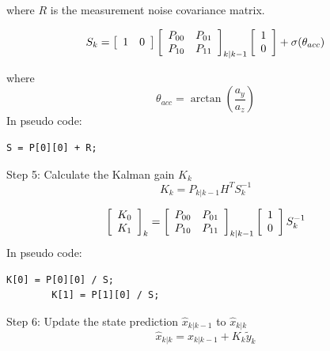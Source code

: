\documentclass[a4paper]{report}
\begin{document}
		where $R$ is the measurement noise covariance matrix.

		\begin{equation}
		S_{k}=
		\left[
		\begin{array}{c c}
		1	&	0
		\end{array} \right]
		\left[
		\begin{array}{c c}
		P_{00}	&	P_{01}\\
		P_{10}	&	P_{11}
		\end{array} \right]_{k|k-1}
		\left[
		\begin{array}{c}
		1\\
		0
		\end{array} \right]
		+ \sigma(\theta_{acc})
		\end{equation}

		where
		\begin{equation*}
		\theta_{acc}=\arctan{\left(\frac{a_{y}}{a_{z}}\right)}
		 \end{equation*}
    In pseudo code:
		\begin{lstlisting}[frame=single]
		S = P[0][0] + R;
		\end{lstlisting}
		Step 5: Calculate the Kalman gain $K_{k}$
		\begin{equation}
		K_{k}=P_{k|k-1}H^{T}S^{-1}_{k}
		\end{equation}

		\begin{equation}
		\left[
		\begin{array}{c}
		K_{0}\\
		K_{1}
		\end{array} \right]_{k}
		=
		\left[
		\begin{array}{c c}
		P_{00}	&	P_{01}\\
		P_{10}	&	P_{11}
		\end{array}  \right]_{k|k-1}
		\left[
		\begin{array}{c}
		1\\
		0
		\end{array} \right]
		S^{-1}_{k}
		\end{equation}
    In pseudo code:
		\begin{lstlisting}[frame=single]
		K[0] = P[0][0] / S;
		K[1] = P[1][0] / S;
		\end{lstlisting}
		Step 6: Update the state prediction $\hat{x}_{k|k-1}$ to  $\hat{x}_{k|k}$
		\begin{equation}
		\hat{x}_{k|k}=\hat{x}_{k|k-1}+K_{k}\tilde{y}_{k}
		\end{equation}
\end{document}
